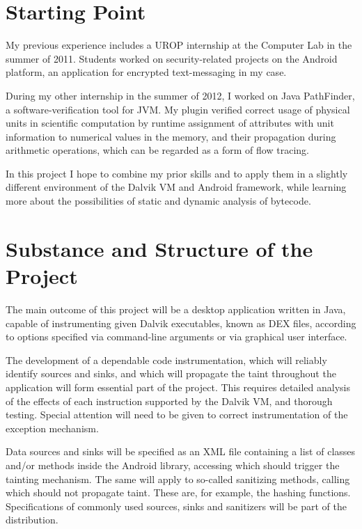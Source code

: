 \documentclass[12pt]{article}
\begin{document}
\section*{Starting Point}

My previous experience includes a UROP internship at the Computer Lab
in the summer of 2011. Students worked on security-related projects on
the Android platform, an application for encrypted text-messaging in my
case.

During my other internship in the summer of 2012, I worked on Java PathFinder,
a software-verification tool for JVM. My plugin verified correct usage of 
physical units in scientific computation by runtime assignment of attributes 
with unit information to numerical values in the memory, and their propagation 
during arithmetic operations, which can be regarded as a form of flow tracing. 

In this project I hope to combine my prior skills and to apply them in a 
slightly different environment of the Dalvik VM and Android framework,
while learning more about the possibilities of static and dynamic analysis
of bytecode.

\section*{Substance and Structure of the Project}

The main outcome of this project will be a desktop application written 
in Java, capable of instrumenting given Dalvik executables, known as DEX
files, according to options specified via command-line arguments or via
graphical user interface.


The development of a dependable code instrumentation, which will reliably 
identify sources and sinks, and which will propagate the taint throughout 
the application will form essential part of the project. This requires 
detailed analysis of the effects of each instruction supported by the 
Dalvik VM, and thorough testing. Special attention will need to be given 
to correct instrumentation of the exception mechanism.

Data sources and sinks will be specified as an XML file containing a list
of classes and/or methods inside the Android library, accessing which
should trigger the tainting mechanism. The same will apply to so-called 
sanitizing methods, calling which should not propagate taint. These
are, for example, the hashing functions. Specifications of commonly used 
sources, sinks and sanitizers will be part of the distribution.
\end{document}
